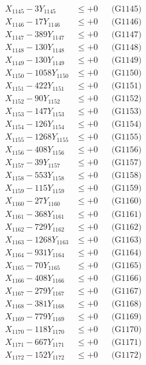 \documentclass[a4paper,10pt]{article}
\begin{document}
{\begin{align}
X_{1145} - 3Y_{1145} &\leq +0 && \text{(G1145)} \\
X_{1146} - 17Y_{1146} &\leq +0 && \text{(G1146)} \\
X_{1147} - 389Y_{1147} &\leq +0 && \text{(G1147)} \\
X_{1148} - 130Y_{1148} &\leq +0 && \text{(G1148)} \\
X_{1149} - 130Y_{1149} &\leq +0 && \text{(G1149)} \\
X_{1150} - 1058Y_{1150} &\leq +0 && \text{(G1150)} \\
\allowbreak
X_{1151} - 422Y_{1151} &\leq +0 && \text{(G1151)} \\
X_{1152} - 90Y_{1152} &\leq +0 && \text{(G1152)} \\
X_{1153} - 147Y_{1153} &\leq +0 && \text{(G1153)} \\
X_{1154} - 126Y_{1154} &\leq +0 && \text{(G1154)} \\
X_{1155} - 1268Y_{1155} &\leq +0 && \text{(G1155)} \\
X_{1156} - 408Y_{1156} &\leq +0 && \text{(G1156)} \\
X_{1157} - 39Y_{1157} &\leq +0 && \text{(G1157)} \\
X_{1158} - 553Y_{1158} &\leq +0 && \text{(G1158)} \\
X_{1159} - 115Y_{1159} &\leq +0 && \text{(G1159)} \\
X_{1160} - 27Y_{1160} &\leq +0 && \text{(G1160)} \\
\allowbreak
X_{1161} - 368Y_{1161} &\leq +0 && \text{(G1161)} \\
X_{1162} - 729Y_{1162} &\leq +0 && \text{(G1162)} \\
X_{1163} - 1268Y_{1163} &\leq +0 && \text{(G1163)} \\
X_{1164} - 931Y_{1164} &\leq +0 && \text{(G1164)} \\
X_{1165} - 70Y_{1165} &\leq +0 && \text{(G1165)} \\
X_{1166} - 408Y_{1166} &\leq +0 && \text{(G1166)} \\
X_{1167} - 279Y_{1167} &\leq +0 && \text{(G1167)} \\
X_{1168} - 381Y_{1168} &\leq +0 && \text{(G1168)} \\
X_{1169} - 779Y_{1169} &\leq +0 && \text{(G1169)} \\
X_{1170} - 118Y_{1170} &\leq +0 && \text{(G1170)} \\
\allowbreak
X_{1171} - 667Y_{1171} &\leq +0 && \text{(G1171)} \\
X_{1172} - 152Y_{1172} &\leq +0 && \text{(G1172)} \\

\end{align}}
\end{document}
